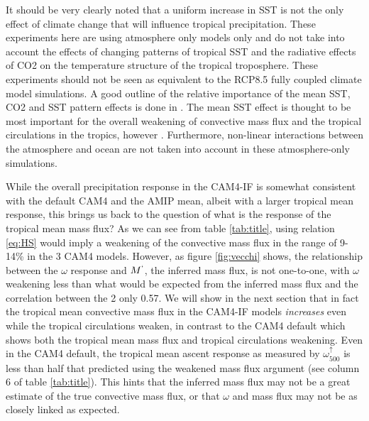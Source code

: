 \documentclass[letterpaper,12pt,titlepage,oneside,final]{book}
\begin{document}
It should be very clearly noted that a uniform increase in SST is not the only effect of climate change that will influence tropical precipitation. These experiments here are using atmosphere only models only and do not take into account the effects of changing patterns of tropical SST and the radiative effects of CO2 on the temperature structure of the tropical troposphere. These experiments should not be seen as equivalent to the RCP8.5 fully coupled climate model simulations. A good outline of the relative importance of the mean SST, CO2 and SST pattern effects is done in \citep{he_anthropogenic_2015}. The mean SST effect is thought to be most important for the overall weakening of convective mass flux and the tropical circulations in the tropics, however \citep{held_robust_2006,ma_mechanisms_2011,vecchi_global_2007,he_anthropogenic_2015}. Furthermore, non-linear interactions between the atmosphere and ocean are not taken into account in these atmosphere-only simulations.

While the overall precipitation response in the CAM4-IF is somewhat consistent with the default CAM4 and the AMIP mean, albeit with a larger tropical mean response, this brings us back to the question of what is the response of the tropical mean mass flux? As we can see from table \ref{tab:title}, using relation \ref{eq:HS} would imply a weakening of the convective mass flux in the range of 9-14\% in the 3 CAM4 models. However, as figure \ref{fig:vecchi} shows, the relationship between the $\omega$ response and $M^{`}$, the inferred mass flux, is not one-to-one, with $\omega$ weakening less than what would be expected from the inferred mass flux and the correlation between the 2 only 0.57. We will show in the next section that in fact the tropical mean convective mass flux in the CAM4-IF models \textit{increases} even while the tropical circulations weaken, in contrast to the CAM4 default which shows both the tropical mean mass flux and tropical circulations weakening. Even in the CAM4 default, the tropical mean ascent response as measured by $\omega_{500}^{\uparrow}$ is less than half that predicted using the weakened mass flux argument (see column 6 of table \ref{tab:title}). This hints that the inferred mass flux may not be a great estimate of the true convective mass flux, or that $\omega$ and mass flux may not be as closely linked as expected.
\end{document}

